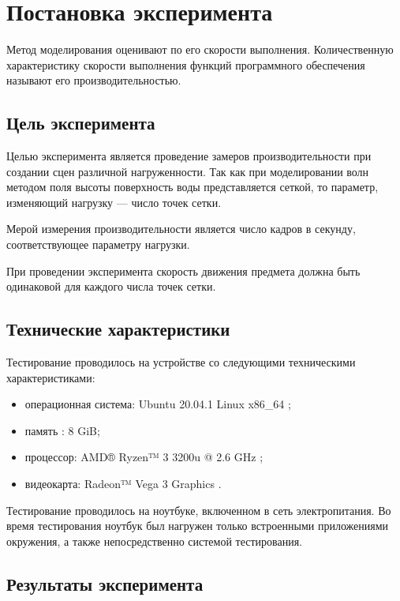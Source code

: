 \section{Постановка эксперимента}

Метод моделирования оценивают по его скорости выполнения. Количественную характеристику скорости выполнения функций программного обеспечения называют его производительностью.

\subsection{Цель эксперимента}

Целью эксперимента является проведение замеров производительности при создании сцен различной нагруженности. Так как при моделировании волн методом поля высоты поверхность воды представляется сеткой, то параметр, изменяющий нагрузку --- число точек сетки.

Мерой измерения производительности является число кадров в секунду, соответствующее параметру нагрузки. 

При проведении эксперимента скорость движения предмета должна быть одинаковой для каждого числа точек сетки.

\subsection{Технические характеристики}

Тестирование проводилось на устройстве со следующими техническими характеристиками:

\begin{itemize}
	\item операционная система: Ubuntu 20.04.1 Linux x86\_64 \cite{linux};
	\item память : 8 GiB;
	\item процессор: AMD® Ryzen™ 3 3200u @ 2.6 GHz \cite{amd};
	\item видеокарта: Radeon™ Vega 3 Graphics \cite{amd}.
\end{itemize}

Тестирование проводилось на ноутбуке, включенном в сеть электропитания. Во время тестирования ноутбук был нагружен только встроенными приложениями окружения, а также непосредственно системой тестирования.

\subsection{Результаты эксперимента}

